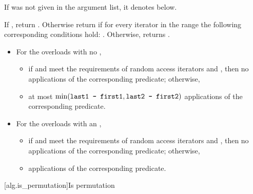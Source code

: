 \begin{itemdescr}
\pnum
\remarks If  was not given in the argument list, it denotes
 below.

\pnum
\returns
If
,
return
.
Otherwise return
if for every iterator
in the range 
the following corresponding conditions hold:
.
Otherwise, returns
.

\pnum
\complexity
\begin{itemize}
\item
For the overloads with no ,
\begin{itemize}
\item
if
and
meet the requirements of random access iterators
and
,
then
no applications of the corresponding predicate; otherwise,

\item
at most
$\min(\texttt{last1 - first1}, \texttt{last2 - first2})$
applications of the corresponding predicate.
\end{itemize}

\item
For the overloads with an ,
\begin{itemize}
\item
if
and
meet the requirements of random access iterators and
, then
no applications of the corresponding predicate; otherwise,

\item
{} applications
of the corresponding predicate.
\end{itemize}
\end{itemize}
\end{itemdescr}

[alg.is_permutation]{Is permutation}

